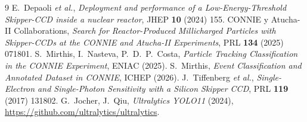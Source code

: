 \documentclass[10pt,a4paper]{article}
\begin{document}
\vspace{-3mm}
{\small
\begin{thebibliography}{9}\setlength{\itemsep}{0pt}
 E.~Depaoli \emph{et al.}, \emph{Deployment and performance of a Low-Energy-Threshold
  Skipper-CCD inside a nuclear reactor}, JHEP \textbf{10} (2024) 155.
 CONNIE y Atucha-II Collaborations, \emph{Search for Reactor-Produced Millicharged
  Particles with Skipper-CCDs at the CONNIE and Atucha-II Experiments}, PRL \textbf{134} (2025) 071801.
 S.~Mirthis, I.~Nasteva, P.~D.~P.~Costa, \emph{Particle Tracking Classification in the
  CONNIE Experiment}, ENIAC (2025).
 S.~Mirthis, \emph{Event Classification and Annotated Dataset in CONNIE}, ICHEP (2026).
 J.~Tiffenberg \emph{et al.}, \emph{Single-Electron and Single-Photon Sensitivity with
  a Silicon Skipper CCD}, PRL \textbf{119} (2017) 131802.
 G.~Jocher, J.~Qiu, \emph{Ultralytics YOLO11} (2024), \url{https://github.com/ultralytics/ultralytics}.
\end{thebibliography}}
\end{document}

